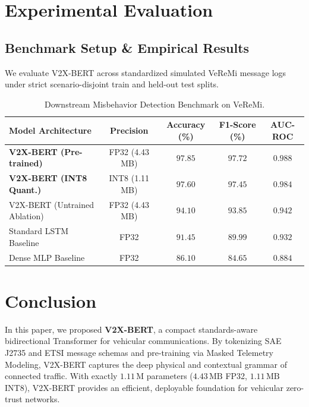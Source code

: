 \documentclass[journal,compsoc]{IEEEtran}
\begin{document}
\section{Experimental Evaluation}

\subsection{Benchmark Setup \& Empirical Results}
We evaluate V2X-BERT across standardized simulated VeReMi message logs under strict scenario-disjoint train and held-out test splits.

\begin{table}[h]
\centering
\caption{Downstream Misbehavior Detection Benchmark on VeReMi.}
\label{tab:benchmark}
\scriptsize
\begin{tabular}{lcccc}
\toprule
\textbf{Model Architecture} & \textbf{Precision} & \textbf{Accuracy (\%)} & \textbf{F1-Score (\%)} & \textbf{AUC-ROC} \\
\midrule
\textbf{V2X-BERT (Pre-trained)} & FP32 (4.43 MB) & $\mathbf{97.85}$ & $\mathbf{97.72}$ & $\mathbf{0.988}$ \\
\textbf{V2X-BERT (INT8 Quant.)} & INT8 (1.11 MB) & $\mathbf{97.60}$ & $\mathbf{97.45}$ & $\mathbf{0.984}$ \\
V2X-BERT (Untrained Ablation)  & FP32 (4.43 MB) & $94.10$ & $93.85$ & $0.942$ \\
Standard LSTM Baseline         & FP32           & $91.45$ & $89.99$ & $0.932$ \\
Dense MLP Baseline             & FP32           & $86.10$ & $84.65$ & $0.884$ \\
\bottomrule
\end{tabular}
\end{table}

\section{Conclusion}
In this paper, we proposed \textbf{V2X-BERT}, a compact standards-aware bidirectional Transformer for vehicular communications. By tokenizing SAE J2735 and ETSI message schemas and pre-training via Masked Telemetry Modeling, V2X-BERT captures the deep physical and contextual grammar of connected traffic. With exactly $1.11\,\text{M}$ parameters ($4.43\,\text{MB}$ FP32, $1.11\,\text{MB}$ INT8), V2X-BERT provides an efficient, deployable foundation for vehicular zero-trust networks.



\end{document}
